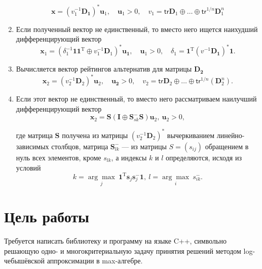 \documentclass[specialist,
  substylefile = spbu.rtx,
  href,
  colorlinks=true,
  12pt]{disser}
\begin{document}
\begin{enumerate}
	\begin{equation*}
		\boldsymbol{x} = (v^{-1}_1\boldsymbol{D_1})^*\boldsymbol{u}_1,\quad \boldsymbol{u}_1 > 0,\quad v_1 = \mathsf{tr}\boldsymbol{D}_1\oplus\dots\oplus \mathsf{tr}^{1/n}\boldsymbol{D}_1^n
	\end{equation*}
	\item Если полученный вектор не единственный, то вместо него ищется наихудший дифференцирующий вектор
	\begin{equation*}
		\boldsymbol{x}_1 = (\delta^{-1}_1\boldsymbol{11}^\mathrm{T}\oplus v^{-1}_1\boldsymbol{D}_1)^*\boldsymbol{u_1},\quad \boldsymbol{u}_1 > 0,\quad \delta_1 = \boldsymbol{1}^\mathrm{T}(v^{-1}\boldsymbol{D_1})^*\boldsymbol{1}.  
	\end{equation*}
	\item Вычисляется вектор рейтингов альтернатив для матрицы $\boldsymbol{D_2}$
	\begin{equation*}
		\boldsymbol{x}_2 = (v^{-1}_2\boldsymbol{D}_2)^*\boldsymbol{u}_2,\quad \boldsymbol{u_2} > 0,\quad v_2 = \mathsf{tr}\boldsymbol{D}_2\oplus\ldots\oplus\mathsf{tr}^{1/n}(\boldsymbol{D}^n_2).  
	\end{equation*}
	
	\item Если этот вектор не единственный, то вместо него рассматриваем наилучший дифференцирующий вектор
	\begin{equation*}
		\boldsymbol{x}_2 =\boldsymbol{S}(\boldsymbol{I}\oplus\boldsymbol{S}^-_{sk}\boldsymbol{S})\boldsymbol{u}_2,~ \boldsymbol{u}_2 > 0,  
	\end{equation*}
	
	где матрица $\boldsymbol{S}$ получена из матрицы $(v^{-1}_2\boldsymbol{D}_2)^*$ вычеркиванием линейно-зависимых столбцов, матрица $\boldsymbol{S}^-_{lk}$ --- из матрицы $S = (s_{ij})$ обращением
	в нуль всех элементов, кроме $s_{lk}$, а индексы $k$ и $l$ определяются, исходя из условий
	\begin{equation*}
		k = \underset{j}{\arg\max}~\boldsymbol{1}^\mathrm{T}\boldsymbol{s}_j\boldsymbol{s}^-_j\boldsymbol{1},~l = \underset{i}{\arg\max} ~s^-_{ik}.
	\end{equation*}
\end{enumerate}


\section{Цель работы}
  Требуется написать библиотеку и программу на языке C++, символьно решающую одно- и многокритериальную задачу принятия решений методом log-чебышёвской аппроксимации в max-алгебре.
\end{document}
